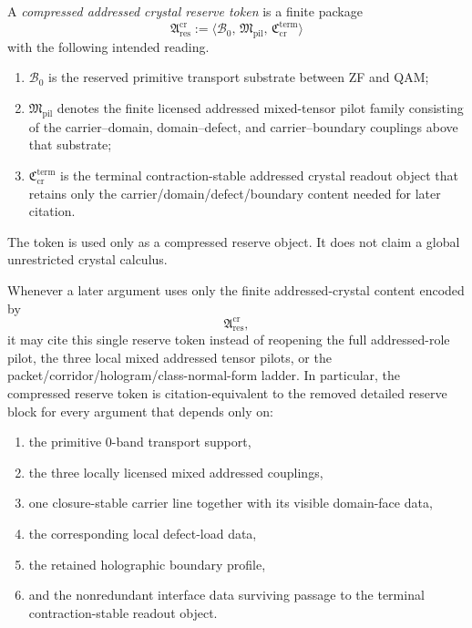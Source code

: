 \begin{definition}
\label{def:compressed-addressed-crystal-reserve-token}
A \emph{compressed addressed crystal reserve token} is a finite package
\[
 \mathfrak A^{\mathrm{cr}}_{\mathrm{res}}
 :=
 \langle \mathcal B_0,\, \mathfrak M_{\mathrm{pil}},\, \mathfrak C^{\mathrm{term}}_{\mathrm{cr}} \rangle
\]
with the following intended reading.
\begin{enumerate}[leftmargin=2em,label=(\roman*)]
 \item $\mathcal B_0$ is the reserved primitive transport substrate between ZF and QAM;
 \item $\mathfrak M_{\mathrm{pil}}$ denotes the finite licensed addressed mixed-tensor pilot family consisting of the carrier--domain, domain--defect, and carrier--boundary couplings above that substrate;
 \item $\mathfrak C^{\mathrm{term}}_{\mathrm{cr}}$ is the terminal contraction-stable addressed crystal readout object that retains only the carrier/domain/defect/boundary content needed for later citation.
\end{enumerate}
The token is used only as a compressed reserve object. It does not claim a global unrestricted crystal calculus.
\end{definition}

\begin{proposition}
\label{prop:compressed-addressed-crystal-reserve-package}
Whenever a later argument uses only the finite addressed-crystal content encoded by
\[
 \mathfrak A^{\mathrm{cr}}_{\mathrm{res}},
\]
it may cite this single reserve token instead of reopening the full addressed-role pilot, the three local mixed addressed tensor pilots, or the packet/corridor/hologram/class-normal-form ladder. In particular, the compressed reserve token is citation-equivalent to the removed detailed reserve block for every argument that depends only on:
\begin{enumerate}[leftmargin=2em,label=(\roman*)]
 \item the primitive 0-band transport support,
 \item the three locally licensed mixed addressed couplings,
 \item one closure-stable carrier line together with its visible domain-face data,
 \item the corresponding local defect-load data,
 \item the retained holographic boundary profile,
 \item and the nonredundant interface data surviving passage to the terminal contraction-stable readout object.
\end{enumerate}
\end{proposition}


